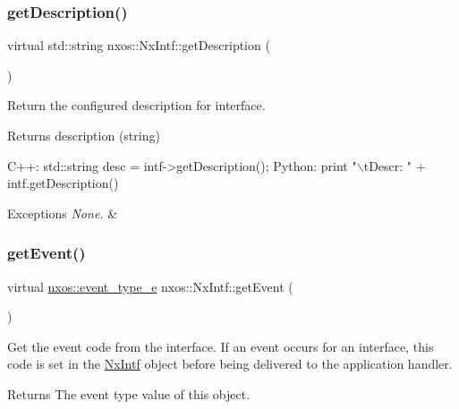 \subsubsection{\texorpdfstring{get\+Description()}{getDescription()}}
{\footnotesize\ttfamily virtual std\+::string nxos\+::\+Nx\+Intf\+::get\+Description (\begin{DoxyParamCaption}{ }\end{DoxyParamCaption})\hspace{0.3cm}{\ttfamily [pure virtual]}}

Return the configured description for interface.

\begin{DoxyReturn}{Returns}
description (string)
\end{DoxyReturn}

\begin{DoxyCode}
C++:
       std::string desc = intf->getDescription();
Python:
       print \textcolor{stringliteral}{"\(\backslash\)tDescr: "} + intf.getDescription()
\end{DoxyCode}



\begin{DoxyExceptions}{Exceptions}
{\em None.} & \\
\hline
\end{DoxyExceptions}
\mbox{\label{classnxos_1_1_nx_intf_a148d8b41d613478294179277a03f3aeb}} 
\subsubsection{\texorpdfstring{get\+Event()}{getEvent()}}
{\footnotesize\ttfamily virtual \mbox{\hyperlink{nx__common_8h_af9a9040b7681199d386e94eb888018cb}{nxos\+::event\+\_\+type\+\_\+e}} nxos\+::\+Nx\+Intf\+::get\+Event (\begin{DoxyParamCaption}{ }\end{DoxyParamCaption})\hspace{0.3cm}{\ttfamily [pure virtual]}}

Get the event code from the interface. If an event occurs for an interface, this code is set in the \mbox{\hyperlink{classnxos_1_1_nx_intf}{Nx\+Intf}} object before being delivered to the application handler.

\begin{DoxyReturn}{Returns}
The event type value of this object.
\end{DoxyReturn}

